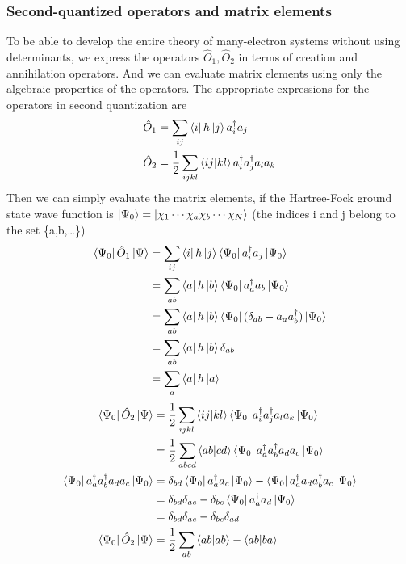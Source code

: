 \documentclass[11pt]{article}
\begin{document}
\subsubsection{Second-quantized operators and matrix elements}
To be able to develop the entire theory of many-electron systems without using determinants, we express the operators
$\hat{O}_1, \hat{O}_2$ in terms of creation and annihilation operators. And we can evaluate matrix elements using only
the algebraic properties of the operators. The appropriate expressions for the operators in second quantization are
\begin{align}
    \hat{O}_1&=\sum_{ij}\bra{i}h\ket{j}a_i^\dagger a_j\\
    \hat{O}_2&=\frac{1}{2}\sum_{ijkl}\braket{ij|kl}a_i^\dagger a_j^\dagger a_l a_k
\end{align}
Then we can simply evaluate the matrix elements, if the Hartree-Fock ground state wave function is 
$\ket{\Psi_0}=\ket{\chi_1\cdots\chi_a\chi_b\cdots\chi_N}$ (the indices i and j belong to the set \{a,b,\ldots\})
\begin{equation}
    \begin{split}
        \bra{\Psi_0}\hat{O}_1\ket{\Psi}&=\sum_{ij}\bra{i}h\ket{j}\bra{\Psi_0}a_i^\dagger a_j\ket{\Psi_0}\\
        &=\sum_{ab}\bra{a}h\ket{b}\bra{\Psi_0}a_a^\dagger a_b\ket{\Psi_0}\\
        &=\sum_{ab}\bra{a}h\ket{b}\bra{\Psi_0}(\delta_{ab}-a_a a_b^\dagger)\ket{\Psi_0}\\
        &=\sum_{ab}\bra{a}h\ket{b}\delta_{ab}\\
        &=\sum_a\bra{a}h\ket{a}
    \end{split}
\end{equation}
\begin{equation}
    \begin{split}
        \bra{\Psi_0}\hat{O}_2\ket{\Psi}&=\frac{1}{2}\sum_{ijkl}\braket{ij|kl}\bra{\Psi_0}a_i^\dagger a_j^\dagger a_l a_k\ket{\Psi_0}\\
        &=\frac{1}{2}\sum_{abcd}\braket{ab|cd}\bra{\Psi_0}a_a^\dagger a_b^\dagger a_d a_c\ket{\Psi_0}\\
        \bra{\Psi_0}a_a^\dagger a_b^\dagger a_d a_c\ket{\Psi_0}&=\delta_{bd}\bra{\Psi_0}a_a^\dagger a_c\ket{\Psi_0}-\bra{\Psi_0}a_a^\dagger a_d a_b^\dagger  a_c\ket{\Psi_0}\\
        &=\delta_{bd}\delta_{ac}-\delta_{bc}\bra{\Psi_0}a_a^\dagger a_d\ket{\Psi_0}\\
        &=\delta_{bd}\delta_{ac}-\delta_{bc}\delta_{ad}\\
        \bra{\Psi_0}\hat{O}_2\ket{\Psi}&=\frac{1}{2}\sum_{ab}\braket{ab|ab}-\braket{ab|ba}
    \end{split}
\end{equation}
\end{document}

